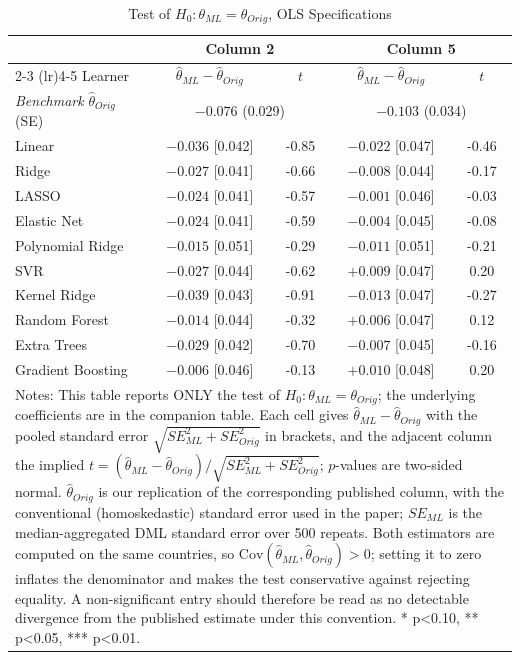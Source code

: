 \begin{table}[htbp]
\centering
\caption{Test of $H_0:\theta_{ML}=\theta_{Orig}$, OLS Specifications}
\label{tab:ols_difference_test}
\begin{tabular}{lcccc}
\toprule
 & \multicolumn{2}{c}{Column 2} & \multicolumn{2}{c}{Column 5} \\
\cmidrule(lr){2-3} \cmidrule(lr){4-5}
Learner & $\hat\theta_{ML}-\hat\theta_{Orig}$ & $t$ & $\hat\theta_{ML}-\hat\theta_{Orig}$ & $t$ \\
\midrule
\textit{Benchmark} $\hat\theta_{Orig}$ (SE) & \multicolumn{2}{c}{$-0.076$ (0.029)} & \multicolumn{2}{c}{$-0.103$ (0.034)} \\
\midrule
Linear & $-0.036$ [0.042] & -0.85 & $-0.022$ [0.047] & -0.46 \\
Ridge & $-0.027$ [0.041] & -0.66 & $-0.008$ [0.044] & -0.17 \\
LASSO & $-0.024$ [0.041] & -0.57 & $-0.001$ [0.046] & -0.03 \\
Elastic Net & $-0.024$ [0.041] & -0.59 & $-0.004$ [0.045] & -0.08 \\
Polynomial Ridge & $-0.015$ [0.051] & -0.29 & $-0.011$ [0.051] & -0.21 \\
SVR & $-0.027$ [0.044] & -0.62 & $+0.009$ [0.047] & 0.20 \\
Kernel Ridge & $-0.039$ [0.043] & -0.91 & $-0.013$ [0.047] & -0.27 \\
Random Forest & $-0.014$ [0.044] & -0.32 & $+0.006$ [0.047] & 0.12 \\
Extra Trees & $-0.029$ [0.042] & -0.70 & $-0.007$ [0.045] & -0.16 \\
Gradient Boosting & $-0.006$ [0.046] & -0.13 & $+0.010$ [0.048] & 0.20 \\
\bottomrule
\multicolumn{5}{p{0.95\linewidth}}{\footnotesize Notes: This table reports ONLY the test of $H_0:\theta_{ML}=\theta_{Orig}$; the underlying coefficients are in the companion table. Each cell gives $\hat\theta_{ML}-\hat\theta_{Orig}$ with the pooled standard error $\sqrt{SE_{ML}^2+SE_{Orig}^2}$ in brackets, and the adjacent column the implied $t=(\hat\theta_{ML}-\hat\theta_{Orig})/\sqrt{SE_{ML}^2+SE_{Orig}^2}$; $p$-values are two-sided normal. $\hat\theta_{Orig}$ is our replication of the corresponding published column, with the conventional (homoskedastic) standard error used in the paper; $SE_{ML}$ is the median-aggregated DML standard error over 500 repeats. Both estimators are computed on the same countries, so $\mathrm{Cov}(\hat\theta_{ML},\hat\theta_{Orig})>0$; setting it to zero inflates the denominator and makes the test conservative against rejecting equality. A non-significant entry should therefore be read as no detectable divergence from the published estimate under this convention. * p<0.10, ** p<0.05, *** p<0.01.}\\
\end{tabular}
\end{table}
